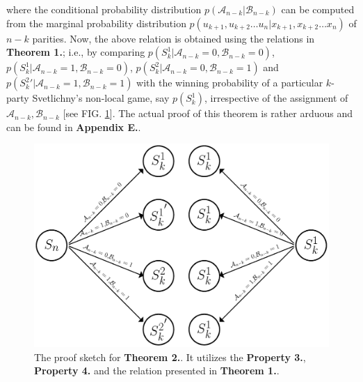 \documentclass[%
 reprint,
 amsmath,amssymb,
 aps,
]{revtex4-1}
\theoremstyle{plain}
\begin{document}
where the conditional probability distribution $p(\mathcal{A}_{n-k}|\mathcal{B}_{n-k})$ can be computed from the marginal probability distribution $p(u_{k+1},u_{k+2} \ldots u_n|x_{k+1},x_{k+2} \ldots x_n)$ of $n-k$ parities. Now, the above relation is obtained using the relations in \textbf{Theorem 1.}; i.e., by comparing $p(S_k^1|\mathcal{A}_{n-k}=0,\mathcal{B}_{n-k}=0)$, $p({S_k^1}|\mathcal{A}_{n-k}=1,\mathcal{B}_{n-k}=0)$, $p(S_k^2|\mathcal{A}_{n-k}=0,\mathcal{B}_{n-k}=1)$ and $p({S_k^2}'|\mathcal{A}_{n-k}=1,\mathcal{B}_{n-k}=1)$ with the winning probability of a particular $k$-party Svetlichny's non-local game, say $p(S_k^1)$, irrespective of the assignment of $\mathcal{A}_{n-k},\mathcal{B}_{n-k}$ [see FIG. \ref{prove_me}]. The actual proof of this theorem is rather arduous and can be found in \textbf{Appendix E.}.\\ 
\begin{figure}[hbtp] 
\includegraphics[scale=0.45]{images/ProofIdea.pdf}

\caption{The proof sketch for \textbf{Theorem 2.}. It utilizes the \textbf{Property 3.}, \textbf{Property 4.} and the relation presented in \textbf{Theorem 1.}.
\label{prove_me}
}
\end{figure}
\end{document}
